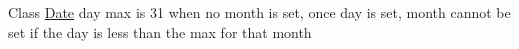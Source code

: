 
\begin{DoxyRefList}
\item[Class \mbox{\hyperlink{class_date}{Date}} ]\label{bug__bug000001}%
%
day max is 31 when no month is set, once day is set, month cannot be set if the day is less than the max for that month 
\end{DoxyRefList}